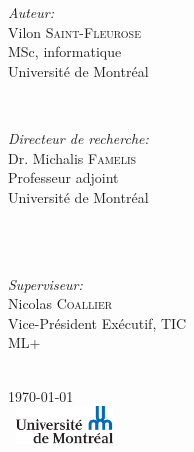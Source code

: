\documentclass[12pt, french]{report}
\begin{document}
\begin{titlepage}
		\begin{minipage}{0.4\textwidth}
			\begin{flushleft} \large
				\emph{Auteur:}\\
				Vilon \textsc{Saint-Fleurose} %
				\\MSc, informatique \\Université de Montréal
			\end{flushleft}
		\end{minipage}
		~
		\begin{minipage}{0.4\textwidth}
			\begin{flushright} \large
				\emph{Directeur de recherche:} \\
				Dr. Michalis \textsc{Famelis} %
				\\Professeur adjoint \\Université de Montréal
			\end{flushright}
		\end{minipage}\\[1cm]
			~
			\begin{minipage}{0.4\textwidth}
				\begin{center} \large
					\emph{Superviseur:} \\
					 Nicolas \textsc{Coallier} %
					\\Vice-Président Exécutif, TIC \\ML+
				\end{center}
			\end{minipage}\\[1cm]
		
		
		
		{\large \today}\\[1cm] %
		
		
		\includegraphics[width=3cm, height=1cm]{images/logo.png} %
		
		
		\vfill %
		
	\end{titlepage}
		
\end{document}
